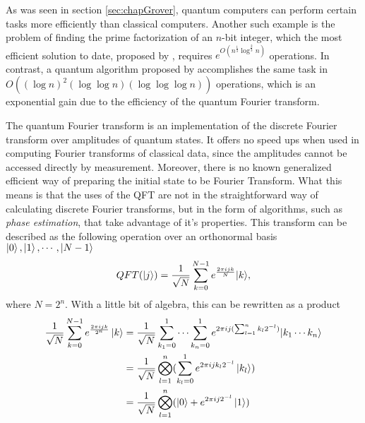 \documentclass[../../../dissertation.tex]{subfiles}
\begin{document}
As was seen in section \ref{sec:chapGrover}, quantum computers can perform certain tasks more efficiently than classical computers. Another such example is the problem of finding the prime factorization of an $n$-bit integer, which the most efficient solution to date, proposed by \cite{Pollard93}, requires $e^{O(n^{\frac{1}{3}}\log^{\frac{2}{3}}n)}$ operations. In contrast, a quantum algorithm proposed by \cite{Shor94} accomplishes the same task in $O((\log n)^2 (\log \log n) (\log \log \log n))$ operations, which is an exponential gain due to the efficiency of the quantum Fourier transform.\par
The quantum Fourier transform is an implementation of the discrete Fourier transform over amplitudes of quantum states. It offers no speed ups when used in computing Fourier transforms of classical data, since the amplitudes cannot be accessed directly by measurement. Moreover, there is no known generalized efficient way of preparing the initial state to be Fourier Transform. What this means is that the uses of the QFT are not in the straightforward way of calculating discrete Fourier transforms, but in the form of algorithms, such as \textit{phase estimation}, that take advantage of it's properties. This transform can be described as the following operation over an orthonormal basis $\ket{0}, \ket{1},\cdots,\ket{N-1}$
\begin{equation}
	QFT(\ket{j}) = \frac{1}{\sqrt{N}} \sum_{k=0}^{N-1} e^{\frac{2\pi i j k}{N}} {\ket{k}},
	\label{eq:qftGeneral}
\end{equation}
where $N = 2^n$. With a little bit of algebra, this can be rewritten as a product
\begin{equation}
	\begin{split}
		\frac{1}{\sqrt{N}} \sum_{k=0}^{N-1} e^{\frac{2\pi i j k}{2^n}} \ket{k} & = 
	\frac{1}{\sqrt{N}} \sum_{k_1=0}^1 \cdots \sum_{k_n=0}^{1} e^{2\pi i j (\sum_{l=1}^{n} k_l 2^{-l})} {\ket{k_1\cdots k_n}}  \\
																 &= \frac{1}{\sqrt{N}} \bigotimes_{l=1}^{n}( \sum_{k_l=0}^{1}  e^{2\pi i j k_l 2^{-l} } \ket{k_l} ) \\
																 &= \frac{1}{\sqrt{N}} \bigotimes_{l=1}^{n}( \ket{0} +  e^{2\pi i j 2^{-l} } \ket{1} )
	\end{split}
\end{equation}\par
\end{document}
